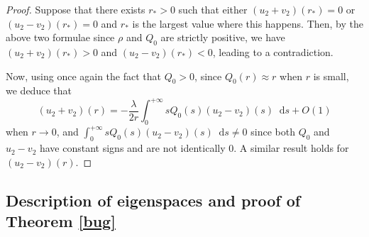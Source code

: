 \documentclass[11 pt]{amsart}
\theoremstyle{definition}
\theoremstyle{remark}
\numberwithin{equation}{section}
\newcommand{\dd}{\mathop{}\!\mathrm{d}}
\begin{document}
\begin{proof}
  Suppose that there exists $r_{\ast} > 0$ such that either $(u_2 + v_2)
  (r_{\ast}) = 0$ or $(u_2 - v_2) (r_{\ast}) = 0$ and $r_{\ast}$ is the
  largest value where this happens. Then, by the above two formulae since
  $\rho$ and $Q_0$ are strictly positive, we have $(u_2 + v_2) (r_{\ast}) > 0$
  and $(u_2 - v_2) (r_{\ast}) < 0$, leading to a contradiction.
  
  Now, using once again the fact that $Q_0 > 0$, since $Q_0 (r) \approx r$
  when $r$ is small, we deduce that
  \[ (u_2 + v_2) (r) = -\frac{\lambda}{2r} \int_0^{+ \infty} s Q_0 (s)
     (u_2 - v_2) (s)\dd s +O(1)\]
  when $r \rightarrow 0$, and $\int_0^{+ \infty} s Q_0 (s) (u_2 - v_2) (s)\dd s
  \neq 0$ since both $Q_0$ and $u_2 - v_2$ have constant signs and are not
  identically $0$. A similar result holds for $(u_2 - v_2) (r)$.
\end{proof}

\subsection{Description of eigenspaces and proof of Theorem \ref{bug}}\label{smn}
\end{document}
